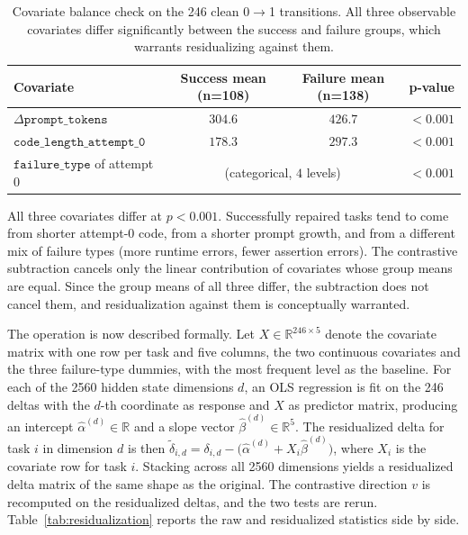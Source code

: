 \begin{table}[h]
\centering
\begin{tabular}{lccc}
\toprule
Covariate & Success mean (n=108) & Failure mean (n=138) & p-value \\
\midrule
$\Delta\texttt{prompt\_tokens}$              & $304.6$ & $426.7$ & $< 0.001$ \\
$\texttt{code\_length\_attempt\_0}$          & $178.3$ & $297.3$ & $< 0.001$ \\
$\texttt{failure\_type}$ of attempt 0        & \multicolumn{2}{c}{(categorical, $4$ levels)} & $< 0.001$ \\
\bottomrule
\end{tabular}
\caption{Covariate balance check on the 246 clean 0$\to$1 transitions. All three observable covariates differ significantly between the success and failure groups, which warrants residualizing against them.}
\label{tab:covariate_check}
\end{table}

All three covariates differ at $p < 0.001$. Successfully repaired tasks tend to come from shorter attempt-0 code, from a shorter prompt growth, and from a different mix of failure types (more runtime errors, fewer assertion errors). The contrastive subtraction cancels only the linear contribution of covariates whose group means are equal. Since the group means of all three differ, the subtraction does not cancel them, and residualization against them is conceptually warranted.

The operation is now described formally. Let $X \in \mathbb{R}^{246 \times 5}$ denote the covariate matrix with one row per task and five columns, the two continuous covariates and the three failure-type dummies, with the most frequent level as the baseline. For each of the 2560 hidden state dimensions $d$, an OLS regression is fit on the 246 deltas with the $d$-th coordinate as response and $X$ as predictor matrix, producing an intercept $\hat{\alpha}^{(d)} \in \mathbb{R}$ and a slope vector $\hat{\beta}^{(d)} \in \mathbb{R}^{5}$. The residualized delta for task $i$ in dimension $d$ is then $\tilde\delta_{i,d} = \delta_{i,d} - \bigl(\hat{\alpha}^{(d)} + X_i \hat{\beta}^{(d)}\bigr)$, where $X_i$ is the covariate row for task $i$. Stacking across all 2560 dimensions yields a residualized delta matrix of the same shape as the original. The contrastive direction $v$ is recomputed on the residualized deltas, and the two tests are rerun. Table~\ref{tab:residualization} reports the raw and residualized statistics side by side.

